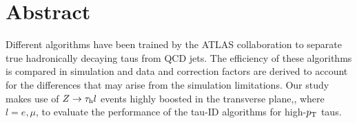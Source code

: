 \chapter*{Abstract}
Different algorithms have been trained by the ATLAS collaboration to separate true hadronically decaying taus from QCD jets. The efficiency of these algorithms is compared in simulation and data and correction factors are derived to account for the differences that may arise from the simulation limitations. Our study makes use of $Z\to\tau_\text{h} l$ events highly boosted in the transverse plane,, where $l=e,\mu$,  to evaluate the performance of the tau-ID algorithms for high-$p_\text{T}$ taus.



